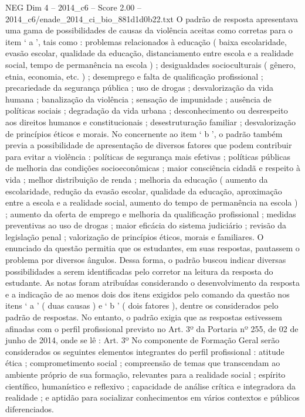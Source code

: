 \begin{textsample}{NEG Dim 4 – 2014\_c6 – Score 2.00 – 2014\_c6/enade\_2014\_ci\_bio\_881d1d0b22.txt}
O padrão de resposta apresentava uma gama de possibilidades de causas da violência aceitas como corretas para o item ‘ a ’, tais como : problemas relacionados à educação ( baixa escolaridade, evasão escolar, qualidade da educação, distanciamento entre escola e a realidade social, tempo de permanência na escola ) ; desigualdades socioculturais ( gênero, etnia, economia, etc. ) ; desemprego e falta de qualificação profissional ; precariedade da segurança pública ; uso de drogas ; desvalorização da vida humana ; banalização da violência ; sensação de impunidade ; ausência de políticas sociais ; degradação da vida urbana ; desconhecimento ou desrespeito aos direitos humanos e constitucionais ; desestruturação familiar ; desvalorização de princípios éticos e morais.
No concernente ao item ‘ b ’, o padrão também previa a possibilidade de apresentação de diversos fatores que podem contribuir para evitar a violência : políticas de segurança mais efetivas ; políticas públicas de melhoria das condições socioeconômicas ; maior consciência cidadã e respeito à vida ; melhor distribuição de renda ; melhoria da educação ( aumento da escolaridade, redução da evasão escolar, qualidade da educação, aproximação entre a escola e a realidade social, aumento do tempo de permanência na escola ) ; aumento da oferta de emprego e melhoria da qualificação profissional ; medidas preventivas ao uso de drogas ; maior eficácia do sistema judiciário ; revisão da legislação penal ; valorização de princípios éticos, morais e familiares.
O enunciado da questão permitia que os estudantes, em suas respostas, pautassem o problema por diversos ângulos.
Dessa forma, o padrão buscou indicar diversas possibilidades a serem identificadas pelo corretor na leitura da resposta do estudante.
As notas foram atribuídas considerando o desenvolvimento da resposta e a indicação de ao menos dois dos itens exigidos pelo comando da questão nos itens ‘ a ’ ( duas causas ) e ‘ b ’ ( dois fatores ), dentre os considerados pelo padrão de respostas.
No entanto, o padrão exigia que as respostas estivessem afinadas com o perfil profissional previsto no Art. 3º da Portaria nº 255, de 02 de junho de 2014, onde se lê : Art. 3º No componente de Formação Geral serão considerados os seguintes elementos integrantes do perfil profissional : atitude ética ; comprometimento social ; compreensão de temas que transcendam ao ambiente próprio de sua formação, relevantes para a realidade social ; espírito científico, humanístico e reflexivo ; capacidade de análise crítica e integradora da realidade ; e aptidão para socializar conhecimentos em vários contextos e públicos diferenciados.

\end{textsample}
